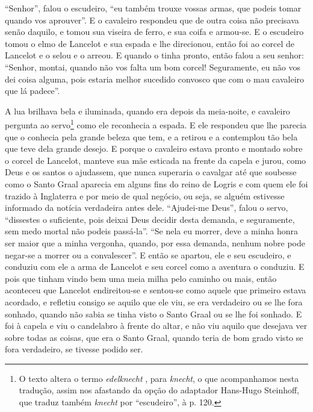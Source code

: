 “Senhor”, falou o escudeiro, “eu também trouxe vossas armas, que podeis tomar
quando vos aprouver”. E o cavaleiro respondeu que de outra coisa não precisava
senão daquilo, e tomou sua viseira de ferro, e sua coifa e armou-se. E o
escudeiro tomou o elmo de Lancelot e sua espada e lhe direcionou, então foi ao
corcel de Lancelot e o selou e o arreou. E quando o tinha pronto, então falou
a seu senhor: “Senhor, montai, quando não vos falta um bom corcel! Seguramente,
eu não vos dei coisa alguma, pois estaria melhor sucedido convosco que com o
mau cavaleiro que lá padece”. 

A lua brilhava bela e iluminada, quando era depois da meia-noite, e cavaleiro
pergunta ao servo\footnote{ O texto altera o termo \textit{edelknecht}
, para \textit{knecht},  o que acompanhamos nesta tradução,
assim nos afastando da opção do adaptador Hans-Hugo Steinhoff, que traduz
também \textit{knecht} por “escudeiro”,  à p. 120.}  como ele reconhecia a espada. E ele
respondeu que lhe parecia que o conhecia pela grande beleza que tem, e a
retirou e a contemplou tão bela que teve dela grande desejo. E porque o
cavaleiro estava pronto e montado sobre o corcel de Lancelot, manteve sua mãe
esticada na frente da capela e jurou, como Deus e os santos o ajudassem, que
nunca superaria o cavalgar até que soubesse como o Santo Graal aparecia em
alguns fins do reino de Logris e com quem ele foi trazido à Inglaterra e por
meio de qual negócio, ou seja, se alguém estivesse informado da notícia
verdadeira antes dele. “Ajudei-me Deus”, falou o servo, “dissestes o
suficiente, pois deixai Deus decidir desta demanda, e seguramente, sem medo
mortal não podeis passá-la”. “Se nela eu morrer, deve a minha honra ser maior
que a minha vergonha, quando, por essa demanda, nenhum nobre pode negar-se a
morrer ou a convalescer”. E então se apartou, ele e seu escudeiro, e
conduziu com ele a arma de Lancelot e seu corcel como a aventura o conduziu. E
pois que tinham vindo bem uma meia milha pelo caminho ou mais, então aconteceu
que Lancelot endireitou-se e sentou-se como aquele que primeiro estava
acordado, e refletiu consigo se aquilo que ele viu, se era verdadeiro ou se lhe
fora sonhado, quando não sabia se tinha visto o Santo Graal  ou se lhe foi
sonhado. E foi à capela e viu o candelabro à frente do altar, e não viu aquilo
que desejava ver sobre todas as coisas, que era o Santo Graal, quando teria de
bom grado visto se fora verdadeiro, se tivesse podido ser.

